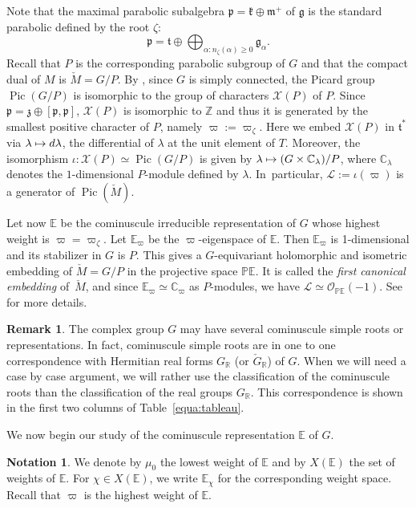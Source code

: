 \documentclass[JEP,XML,SOM,Unicode,NoFloatCountersInSection]{cedram}
\let\mathcal\mathscr
\newcommand{\mto}{\mathchoice{\longmapsto}{\mapsto}{\mapsto}{\mapsto}}
\theoremstyle{plain}
\theoremstyle{definition}
\newtheorem{nota}[theo]{Notation}
\newtheorem{rema}[theo]{Remark}
\DeclareMathOperator{\Pic}{Pic}
\newcommand{\cL}{\mathcal{L}}
\newcommand{\cO}{\mathcal{O}}
\newcommand{\cX}{\mathcal{X}}
\newcommand{\bC}{\mathbb{C}}
\newcommand{\bE}{\mathbb{E}}
\newcommand{\bP}{\mathbb{P}}
\newcommand{\bZ}{\mathbb{Z}}
\newcommand{\bR}{\mathbb{R}}
\newcommand{\fgg}{\mathfrak{g}}
\newcommand{\fk}{\mathfrak{k}}
\newcommand{\fm}{\mathfrak{m}}
\newcommand{\fp}{\mathfrak{p}}
\newcommand{\ft}{\mathfrak{t}}
\newcommand{\fz}{\mathfrak{z}}
\begin{document}
Note that the maximal parabolic subalgebra $\fp=\fk\oplus\fm^+$ of $\fgg$ is the standard parabolic defined by the root
$\zeta$:
$$\fp=\ft\oplus\bigoplus_{\alpha:n_\zeta(\alpha)\geq 0}\fgg_\alpha.$$
Recall that $P$ is the corresponding parabolic subgroup of $G$ and that the compact
dual of $M$ is $\check{M}=G/P$.
By \cite{Murakami}, since $G$ is simply connected, the Picard group $\Pic(G/P)$ is
isomorphic to
the group of characters $\cX(P)$ of $P$. Since $\fp=\fz\oplus[\fp,\fp]$, $\cX(P)$ is isomorphic to
$\bZ$ and thus it is generated by the smallest positive character of $P$, namely $\varpi:=\varpi_\zeta$.
Here we embed $\cX(P)$ in $\ft^*$ via $\lambda \mto d\lambda$, the differential of $\lambda$ at the unit
element of $T$.
Moreover, the isomorphism $\iota:\cX(P) \simeq \Pic(G/P)$ is given by
$\lambda \mto (G \times \bC_\lambda)/P$,
where $\bC_\lambda$ denotes the $1$-dimensional $P$-module defined by $\lambda$.
In~particular, $\cL:=\iota(\varpi)$
is a generator of $\Pic(\check{M})$.

Let now $\bE$ be the cominuscule irreducible representation of $G$ whose highest weight is
$\varpi=\varpi_\zeta$. Let $\bE_\varpi$
be the $\varpi$-eigenspace of $\bE$. Then $\bE_\varpi$ is 1-dimensional and its
stabilizer in $G$ is $P$. This gives a $G$-equivariant holomorphic and isometric embedding of
$\check{M}=G/P$ in the projective space $\bP\bE$. It is called the \emph{first canonical embedding} of~$\check{M}$, and since $\bE_\varpi\simeq \bC_{\varpi}$ as $P$-modules,
we have $\cL \simeq \cO_{\bP
\bE}(-1)$.
See \eg \cite{nakagawa} for more details.

\begin{rema}
The complex group $G$ may have several cominuscule simple roots or representations. In
fact, cominuscule simple roots are in one to one correspondence with Hermitian real forms
$G_\bR$ (or $\check{G}_\bR$) of $G$.
When we will need a case by case argument, we will rather use the
classification of the cominuscule roots than the classification of the real groups $G_\bR$. This correspondence
is shown in the first two columns of Table~\ref{equa:tableau}.
\end{rema}

We now begin our study of the cominuscule representation $\bE$ of $G$.

\begin{nota}
We denote by $\mu_0$ the lowest weight of $\bE$ and by $X(\bE)$ the set
of weights of $\bE$. For $\chi \in X(\bE)$, we write
$\bE_\chi$ for the corresponding weight space. Recall that $\varpi$ is the highest weight of $\bE$.
\end{nota}
\end{document}
